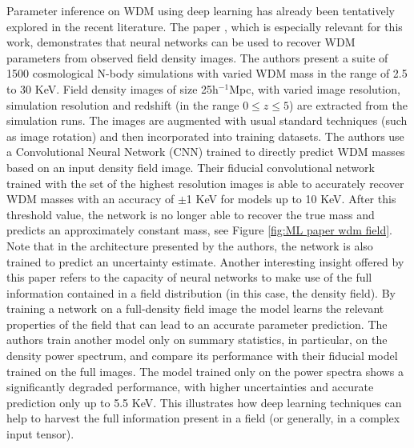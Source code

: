 \par
Parameter inference on WDM using deep learning has already been tentatively explored in the recent literature.
The paper  \cite{wdm_from_field}, which is especially relevant for this work, demonstrates that neural networks can be used to recover WDM parameters from observed field density images. The authors present a suite of 1500 cosmological N-body simulations with varied WDM mass in the range of 2.5 to 30 KeV. Field density images of size 25h$^{-1}$Mpc, with varied image resolution, simulation resolution and redshift (in the range $0\leq z \leq 5$) are extracted from the simulation runs. The images are augmented with usual standard techniques (such as image rotation) and then incorporated into training datasets. The authors use a Convolutional Neural Network (CNN) trained to directly predict WDM masses based on an input density field image. Their fiducial convolutional network trained with the set of the highest resolution images is able to accurately recover WDM masses with an accuracy of $\pm$1 KeV for models up to 10 KeV. After this threshold value, the network is no longer able to recover the true mass and predicts an approximately constant mass, see Figure \ref{fig:ML paper wdm field}. Note that in the architecture presented by the authors, the network is also trained to predict an uncertainty estimate. Another interesting insight offered by this paper refers to the capacity of neural networks to make use of the full information contained in a field distribution (in this case, the density field). By training a network on a full-density field image the model learns the relevant properties of the field that can lead to an accurate parameter prediction. The authors train another model only on summary statistics, in particular, on the density power spectrum, and compare its performance with their fiducial model trained on the full images. The model trained only on the power spectra shows a significantly degraded performance, with higher uncertainties and accurate prediction only up to 5.5 KeV. This illustrates how deep learning techniques can help to harvest the full information present in a field (or generally, in a complex input tensor).


